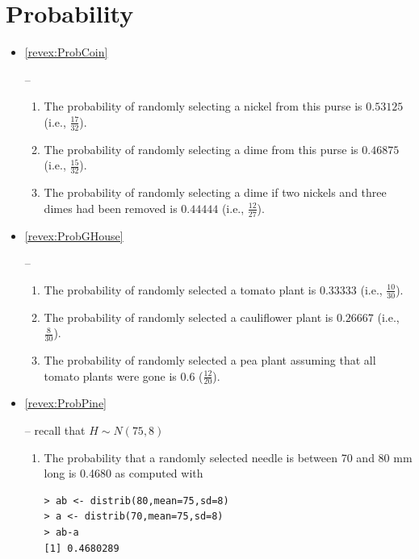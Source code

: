 \documentclass[10pt,openany]{book}\usepackage[]{graphicx}\usepackage[]{color}
\makeatletter
\newenvironment{kframe}{%
 \def\at@end@of@kframe{}%
 \ifinner\ifhmode%
  \def\at@end@of@kframe{\end{minipage}}%
  \begin{minipage}{\columnwidth}%
 \fi\fi%
 \def\FrameCommand##1{\hskip\@totalleftmargin \hskip-\fboxsep
 \colorbox{shadecolor}{##1}\hskip-\fboxsep
     \hskip-\linewidth \hskip-\@totalleftmargin \hskip\columnwidth}%
 \MakeFramed {\advance\hsize-\width
   \@totalleftmargin\z@ \linewidth\hsize
   \@setminipage}}%
 {\par\unskip\endMakeFramed%
 \at@end@of@kframe}
\newenvironment{knitrout}{}{} %
\makeatother
\begin{document}
\section*{Probability}
\begin{itemize}
  \item \hypertarget{ans:ProbCoin}{\ref{revex:ProbCoin}} --
  \begin{enumerate}
    \item The probability of randomly selecting a nickel from this purse is $0.53125$ (i.e., $\frac{17}{32}$).
    \item The probability of randomly selecting a dime from this purse is $0.46875$ (i.e., $\frac{15}{32}$).
    \item The probability of randomly selecting a dime if two nickels and three dimes had been removed is $0.44444$ (i.e., $\frac{12}{27}$).
  \end{enumerate}

  \item \hypertarget{ans:ProbGHouse}{\ref{revex:ProbGHouse}} --
  \begin{enumerate}
    \item The probability of randomly selected a tomato plant is $0.33333$ (i.e., $\frac{10}{30}$).
    \item The probability of randomly selected a cauliflower plant is $0.26667$ (i.e., $\frac{8}{30}$).
    \item The probability of randomly selected a pea plant assuming that all tomato plants were gone is $0.6$ ($\frac{12}{20}$).
  \end{enumerate}

  \item \hypertarget{ans:ProbPine}{\ref{revex:ProbPine}} -- recall that $H\sim N(75,8)$
  \begin{enumerate}
    \item The probability that a randomly selected needle is between 70 and 80 mm long is 0.4680 as computed with
\begin{knitrout}
\color{fgcolor}\begin{kframe}
\begin{verbatim}
> ab <- distrib(80,mean=75,sd=8)
> a <- distrib(70,mean=75,sd=8)
> ab-a
[1] 0.4680289
\end{verbatim}
\end{kframe}


\end{knitrout}
\end{enumerate}
\end{itemize}
\end{document}
